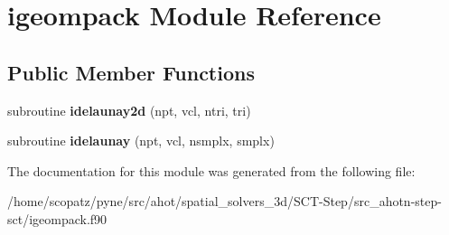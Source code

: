 \hypertarget{classigeompack}{\section{igeompack Module Reference}
\label{classigeompack}
}
\subsection*{Public Member Functions}
\begin{DoxyCompactItemize}
\item 
\hypertarget{classigeompack_af1c735d960955c236182dc083e4e9840}{subroutine {\bfseries idelaunay2d} (npt, vcl, ntri, tri)}\label{classigeompack_af1c735d960955c236182dc083e4e9840}

\item 
\hypertarget{classigeompack_a5afd38aaf62a7dc9d576f59edb07ef93}{subroutine {\bfseries idelaunay} (npt, vcl, nsmplx, smplx)}\label{classigeompack_a5afd38aaf62a7dc9d576f59edb07ef93}

\end{DoxyCompactItemize}


The documentation for this module was generated from the following file\-:\begin{DoxyCompactItemize}
\item 
/home/scopatz/pyne/src/ahot/spatial\-\_\-solvers\-\_\-3d/\-S\-C\-T-\/\-Step/src\-\_\-ahotn-\/step-\/sct/igeompack.\-f90\end{DoxyCompactItemize}
